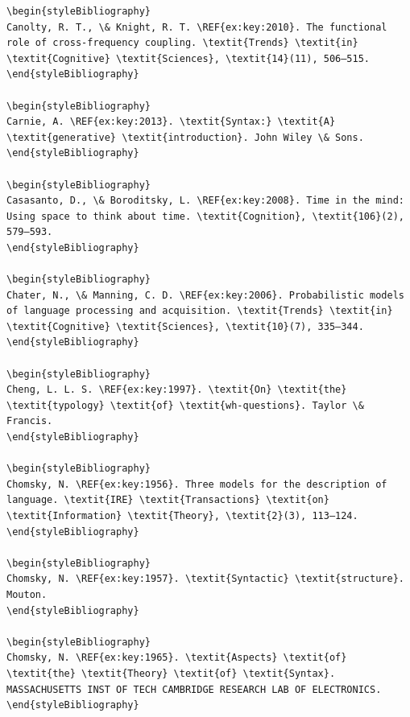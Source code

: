 \begin{verbatim}
\begin{styleBibliography}
Canolty, R. T., \& Knight, R. T. \REF{ex:key:2010}. The functional role of cross-frequency coupling. \textit{Trends} \textit{in} \textit{Cognitive} \textit{Sciences}, \textit{14}(11), 506–515.
\end{styleBibliography}

\begin{styleBibliography}
Carnie, A. \REF{ex:key:2013}. \textit{Syntax:} \textit{A} \textit{generative} \textit{introduction}. John Wiley \& Sons.
\end{styleBibliography}

\begin{styleBibliography}
Casasanto, D., \& Boroditsky, L. \REF{ex:key:2008}. Time in the mind: Using space to think about time. \textit{Cognition}, \textit{106}(2), 579–593.
\end{styleBibliography}

\begin{styleBibliography}
Chater, N., \& Manning, C. D. \REF{ex:key:2006}. Probabilistic models of language processing and acquisition. \textit{Trends} \textit{in} \textit{Cognitive} \textit{Sciences}, \textit{10}(7), 335–344.
\end{styleBibliography}

\begin{styleBibliography}
Cheng, L. L. S. \REF{ex:key:1997}. \textit{On} \textit{the} \textit{typology} \textit{of} \textit{wh-questions}. Taylor \& Francis.
\end{styleBibliography}

\begin{styleBibliography}
Chomsky, N. \REF{ex:key:1956}. Three models for the description of language. \textit{IRE} \textit{Transactions} \textit{on} \textit{Information} \textit{Theory}, \textit{2}(3), 113–124.
\end{styleBibliography}

\begin{styleBibliography}
Chomsky, N. \REF{ex:key:1957}. \textit{Syntactic} \textit{structure}. Mouton.
\end{styleBibliography}

\begin{styleBibliography}
Chomsky, N. \REF{ex:key:1965}. \textit{Aspects} \textit{of} \textit{the} \textit{Theory} \textit{of} \textit{Syntax}. MASSACHUSETTS INST OF TECH CAMBRIDGE RESEARCH LAB OF ELECTRONICS.
\end{styleBibliography}


\end{verbatim}
